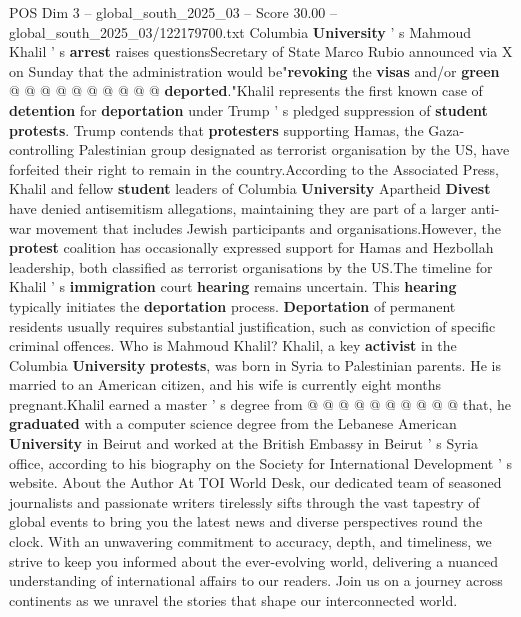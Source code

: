\begin{textsample}{POS Dim 3 – global\_south\_2025\_03 – Score 30.00 – global\_south\_2025\_03/122179700.txt}
Columbia \textbf{University} ' s Mahmoud Khalil ' s \textbf{arrest} raises questionsSecretary of State Marco Rubio announced via X on Sunday that the administration would be"\textbf{revoking} the \textbf{visas} and/or \textbf{green} @ @ @ @ @ @ @ @ @ @ \textbf{deported}."Khalil represents the first known case of \textbf{detention} for \textbf{deportation} under Trump ' s pledged suppression of \textbf{student} \textbf{protests}.
Trump contends that \textbf{protesters} supporting Hamas, the Gaza-controlling Palestinian group designated as terrorist organisation by the US, have forfeited their right to remain in the country.According to the Associated Press, Khalil and fellow \textbf{student} leaders of Columbia \textbf{University} Apartheid \textbf{Divest} have denied antisemitism allegations, maintaining they are part of a larger anti-war movement that includes Jewish participants and organisations.However, the \textbf{protest} coalition has occasionally expressed support for Hamas and Hezbollah leadership, both classified as terrorist organisations by the US.The timeline for Khalil ' s \textbf{immigration} court \textbf{hearing} remains uncertain.
This \textbf{hearing} typically initiates the \textbf{deportation} process. \textbf{Deportation} of permanent residents usually requires substantial justification, such as conviction of specific criminal offences.
Who is Mahmoud Khalil?
Khalil, a key \textbf{activist} in the Columbia \textbf{University} \textbf{protests}, was born in Syria to Palestinian parents.
He is married to an American citizen, and his wife is currently eight months pregnant.Khalil earned a master ' s degree from @ @ @ @ @ @ @ @ @ @ that, he \textbf{graduated} with a computer science degree from the Lebanese American \textbf{University} in Beirut and worked at the British Embassy in Beirut ' s Syria office, according to his biography on the Society for International Development ' s website.
About the Author At TOI World Desk, our dedicated team of seasoned journalists and passionate writers tirelessly sifts through the vast tapestry of global events to bring you the latest news and diverse perspectives round the clock.
With an unwavering commitment to accuracy, depth, and timeliness, we strive to keep you informed about the ever-evolving world, delivering a nuanced understanding of international affairs to our readers.
Join us on a journey across continents as we unravel the stories that shape our interconnected world.

\end{textsample}
